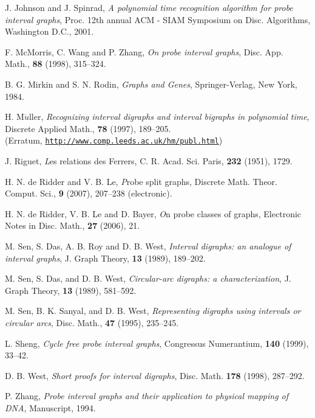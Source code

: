 \documentclass[secthm]{elsart}
\begin{document}
\begin{thebibliography}{10}
J. Johnson and J. Spinrad, \emph{A polynomial time recognition algorithm for probe interval graphs}, Proc. 12th annual ACM - SIAM Symposium on Disc. Algorithms, Washington D.C., 2001.

F. McMorris, C. Wang and P. Zhang, \emph{On probe interval graphs}, Disc. App. Math., \textbf{88} (1998), 315--324.

B. G. Mirkin and S. N. Rodin, \emph{Graphs and Genes}, Springer-Verlag, New York, 1984.

H. M$\ddot{u}$ller, \emph{Recognizing interval digraphs and interval bigraphs in polynomial time}, Discrete Applied Math., \textbf{78} (1997), 189--205.\\
(Erratum, \href{http://www.comp.leeds.ac.uk/hm/publ.html}{\texttt{http://www.comp.leeds.ac.uk/hm/publ.html}})

J. Riguet, {\emph Les relations des Ferrers}, C. R. Acad. Sci. Paris, \textbf{232} (1951), 1729.

H. N. de Ridder and V. B. Le, {\emph Probe split graphs}, Discrete Math. Theor. Comput. Sci., \textbf{9} (2007), 207--238 (electronic).

H. N. de Ridder, V. B. Le and D. Bayer, {\emph On probe classes of graphs}, Electronic Notes in Disc. Math., \textbf{27} (2006), 21.

M. Sen, S. Das, A. B. Roy and D. B. West, \emph{Interval digraphs: an analogue of interval graphs}, J. Graph Theory, \textbf{13} (1989), 189--202.

M. Sen, S. Das, and D. B. West, \emph{Circular-arc digraphs: a characterization}, J. Graph Theory, \textbf{13} (1989), 581--592.

M. Sen, B. K. Sanyal, and D. B. West, \emph{Representing digraphs using intervals or circular arcs}, Disc. Math., \textbf{47} (1995), 235--245.

L. Sheng, \emph{Cycle free probe interval graphs}, Congressus Numerantium, \textbf{140} (1999), 33--42.

D. B. West, \emph{Short proofs for interval digraphs}, Disc. Math. \textbf{178} (1998), 287--292. 

P. Zhang, \emph{Probe interval graphs and their application to physical mapping of DNA}, Manuscript, 1994.

\end{thebibliography}
\end{document}
